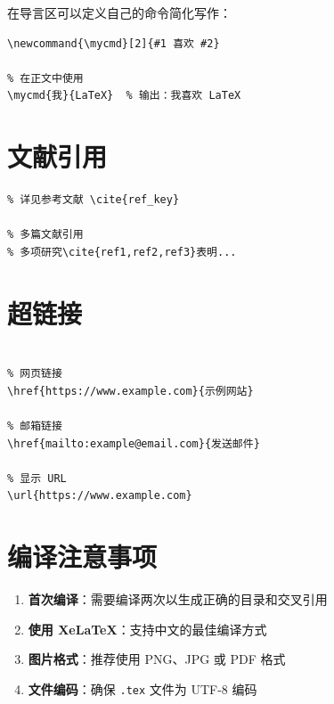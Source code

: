 \documentclass[10pt,openany]{book}
\begin{document}
在导言区可以定义自己的命令简化写作：

\begin{lstlisting}[style=pythonstyle]
% 在导言区定义
\newcommand{\mycmd}[2]{#1 喜欢 #2}

% 在正文中使用
\mycmd{我}{LaTeX}  % 输出：我喜欢 LaTeX
\end{lstlisting}

\section{文献引用}

\begin{lstlisting}[style=pythonstyle]
% 使用 \cite 命令引用文献
% 详见参考文献 \cite{ref_key}

% 多篇文献引用
% 多项研究\cite{ref1,ref2,ref3}表明...
\end{lstlisting}

\section{超链接}

\begin{lstlisting}[style=pythonstyle]
% 导言区需要：\usepackage{hyperref}

% 网页链接
\href{https://www.example.com}{示例网站}

% 邮箱链接
\href{mailto:example@email.com}{发送邮件}

% 显示 URL
\url{https://www.example.com}
\end{lstlisting}

\section{编译注意事项}

\begin{enumerate}
    \item \textbf{首次编译}：需要编译两次以生成正确的目录和交叉引用
    \item \textbf{使用 XeLaTeX}：支持中文的最佳编译方式
    \item \textbf{图片格式}：推荐使用 PNG、JPG 或 PDF 格式
    \item \textbf{文件编码}：确保 \texttt{.tex} 文件为 UTF-8 编码
\end{enumerate}
\end{document}
